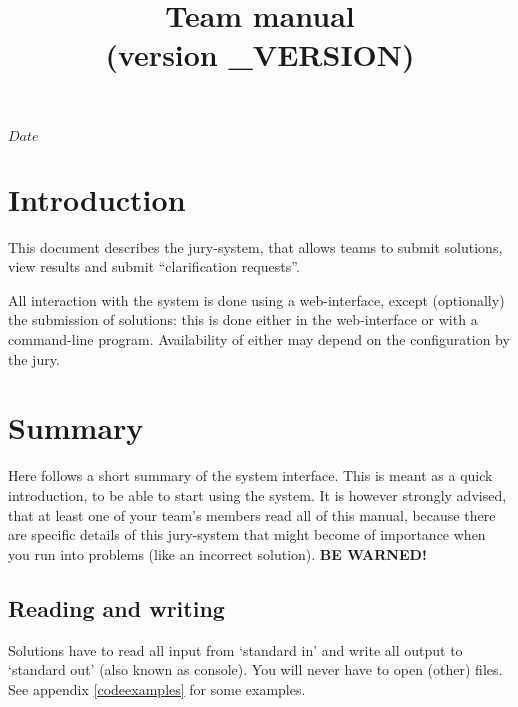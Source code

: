 

\usepackage[english]{babel}

\SVNdate $Date$

\title{Team manual \DOMjudge\\(version \DOMJUDGE_VERSION)}



\begin{titlepage}
\maketitle
\end{titlepage}

\newpage
\tableofcontents

\newpage
\section{Introduction}

This document describes the \DOMjudge jury-system, that allows
teams to submit solutions, view results and submit
``clarification requests''.

All interaction with the system is done using a web-interface, except
(optionally) the submission of solutions: this is done either in the
web-interface or with a command-line program. Availability of either
may depend on the configuration by the jury.

\section{Summary}

Here follows a short summary of the system interface. This is meant as
a quick introduction, to be able to start using the system. It is
however strongly advised, that at least one of your team's members
read all of this manual, because there are specific details of this
jury-system that might become of importance when you run into
problems (like an incorrect solution). \textbf{BE WARNED!}

\subsection{Reading and writing}

Solutions have to read all input from `standard in' and write all
output to `standard out' (also known as console). You will never have
to open (other) files. See appendix \ref{codeexamples} for some
examples.

